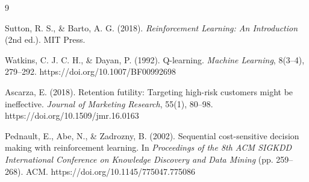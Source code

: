 \documentclass{article}
\begin{document}
\begin{thebibliography}{9}

Sutton, R. S., \& Barto, A. G. (2018). \textit{Reinforcement Learning: An Introduction} (2nd ed.). MIT Press.

Watkins, C. J. C. H., \& Dayan, P. (1992). Q-learning. \textit{Machine Learning}, 8(3--4), 279--292. https://doi.org/10.1007/BF00992698

Ascarza, E. (2018). Retention futility: Targeting high-risk customers might be ineffective. \textit{Journal of Marketing Research}, 55(1), 80--98. https://doi.org/10.1509/jmr.16.0163

Pednault, E., Abe, N., \& Zadrozny, B. (2002). Sequential cost-sensitive decision making with reinforcement learning. In \textit{Proceedings of the 8th ACM SIGKDD International Conference on Knowledge Discovery and Data Mining} (pp. 259--268). ACM. https://doi.org/10.1145/775047.775086

\end{thebibliography}
\end{document}
